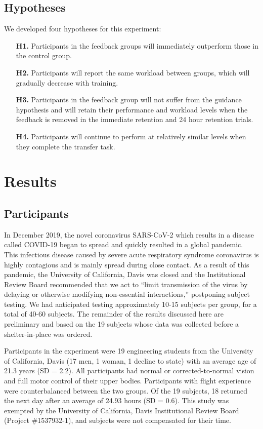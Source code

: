 \subsection{Hypotheses}
We developed four hypotheses for this experiment:
\begin{itemize}
    \item[\textbf{H1.}] Participants in the feedback groups will immediately outperform those in the control group.
    \item[\textbf{H2.}] Participants will report the same workload between groups, which will gradually decrease with training.
    \item[\textbf{H3.}] Participants in the feedback group will not suffer from the guidance hypothesis and will retain their performance and workload levels when the feedback is removed in the immediate retention and 24 hour retention trials.
    \item[\textbf{H4.}] Participants will continue to perform at relatively similar levels when they complete the transfer task.
\end{itemize}

\section{Results}
\subsection{Participants}
In December 2019, the novel coronavirus SARS-CoV-2 which results in a disease called COVID-19 began to spread and quickly resulted in a global pandemic.
This infectious disease caused by severe acute respiratory syndrome coronavirus is highly contagious and is mainly spread during close contact.
As a result of this pandemic, the University of California, Davis was closed and the Institutional Review Board recommended that we act to ``limit transmission of the virus by delaying or otherwise modifying non-essential interactions,'' postponing subject testing.
We had anticipated testing approximately 10-15 subjects per group, for a total of 40-60 subjects.
The remainder of the results discussed here are preliminary and based on the 19 subjects whose data was collected before a shelter-in-place was ordered.

Participants in the experiment were 19 engineering students from the University of California, Davis (17 men, 1 woman, 1 decline to state) with an average age of 21.3 years (SD = 2.2).
All participants had normal or corrected-to-normal vision and full motor control of their upper bodies.
Participants with flight experience were counterbalanced between the two groups.
Of the 19 subjects, 18 returned the next day after an average of 24.93 hours (SD = 0.6).
This study was exempted by the University of California, Davis Institutional Review Board (Project \#1537932-1), and subjects were not compensated for their time.

